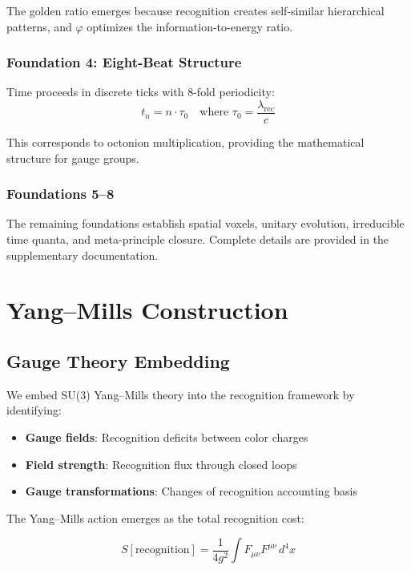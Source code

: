 \documentclass[11pt]{amsart}
\newcommand{\lambdarec}{\lambda_{\text{rec}}}
\newcommand{\taunaught}{\tau_0}
\begin{document}
The golden ratio emerges because recognition creates self-similar hierarchical patterns, and $\varphi$ optimizes the information-to-energy ratio.

\subsubsection{Foundation 4: Eight-Beat Structure}

Time proceeds in discrete ticks with 8-fold periodicity:
\begin{equation}
t_n = n \cdot \taunaught \quad \text{where } \taunaught = \frac{\lambdarec}{c}
\end{equation}

This corresponds to octonion multiplication, providing the mathematical structure for gauge groups.

\subsubsection{Foundations 5--8}

The remaining foundations establish spatial voxels, unitary evolution, irreducible time quanta, and meta-principle closure. Complete details are provided in the supplementary documentation.

\section{Yang--Mills Construction}

\subsection{Gauge Theory Embedding}

We embed SU(3) Yang--Mills theory into the recognition framework by identifying:

\begin{itemize}
\item \textbf{Gauge fields}: Recognition deficits between color charges
\item \textbf{Field strength}: Recognition flux through closed loops  
\item \textbf{Gauge transformations}: Changes of recognition accounting basis
\end{itemize}

The Yang--Mills action emerges as the total recognition cost:

\begin{equation}
S[\text{recognition}] = \frac{1}{4g^2} \int F_{\mu\nu} F^{\mu\nu} \, d^4x
\end{equation}
\end{document}
